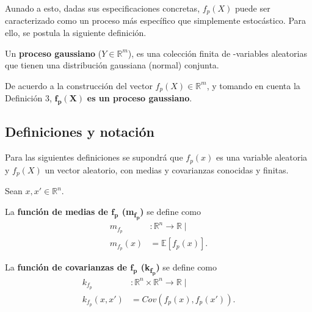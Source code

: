 Aunado a esto, dadas sus especificaciones concretas, $f_p(X)$ puede ser caracterizado como un proceso m\'as espec\'ifico que simplemente estoc\'astico. Para ello, se postula la siguiente definici\'on.

\begin{defin}
    Un \textbf{proceso gaussiano} ($Y \in \mathbb{R}^m$), es una colección finita de -variables aleatorias que tienen una distribución gaussiana (normal) conjunta.
\end{defin}

\begin{obs*}
    De acuerdo a la construcci\'on del vector $f_p(X) \in \mathbb{R}^m$, y tomando en cuenta la Definici\'on 3, $\bm{f_p(X)}$ \textbf{es un proceso gaussiano}.
\end{obs*}


\subsection{Definiciones y notaci\'on}

Para las siguientes definiciones se supondrá que $f_p(x)$ es una variable aleatoria y $f_p(X)$ un vector aleatorio, con medias y covarianzas conocidas y finitas.

\begin{defin*}
Sean $x,x' \in \mathbb{R}^n$.

La \textbf{función de medias de $\bm{f_p}$ (m\textsubscript{$\bm{f_p}$})} se define como 
\begin{equation*}
\begin{aligned}
    m_{f_p}&: \mathbb{R}^n \rightarrow \mathbb{R} 
    \mid\\
    m_{f_p}(x) &= \mathbb{E}[f_p(x)].
\end{aligned}
\end{equation*}

La \textbf{función de covarianzas de $\bm{f_p}$ (k\textsubscript{$\bm{f_p}$})} se define como 
\begin{equation*}
\begin{aligned}
    k_{f_p}&: \mathbb{R}^n \times \mathbb{R}^n \rightarrow \mathbb{R} 
    \mid\\
    k_{f_p}(x, x') &= Cov({f_p}(x),{f_p}(x')).
\end{aligned}
\end{equation*}
\end{defin*}

